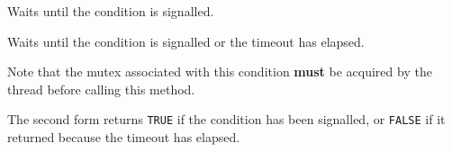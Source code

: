 Waits until the condition is signalled.


Waits until the condition is signalled or the timeout has elapsed.

Note that the mutex associated with this condition {\bf must} be acquired by
the thread before calling this method.





The second form returns {\tt TRUE} if the condition has been signalled, or
{\tt FALSE} if it returned because the timeout has elapsed.


